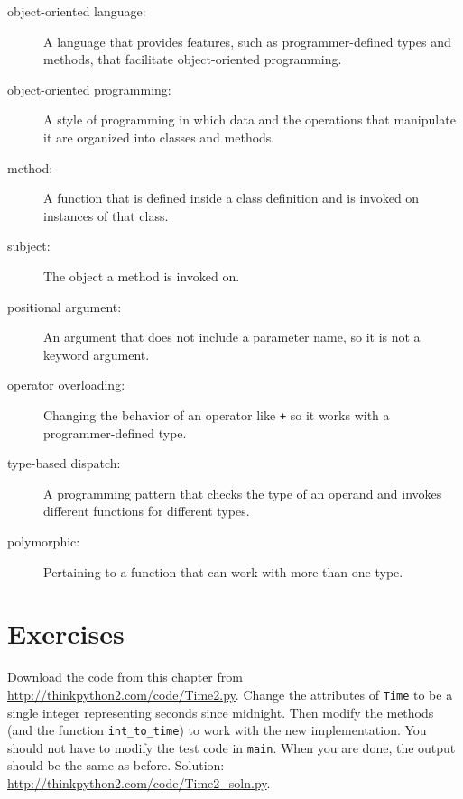 \documentclass[10pt]{book}
\begin{document}
\begin{description}

\item[object-oriented language:] A language that provides features,
  such as programmer-defined types and methods, that facilitate
  object-oriented programming.

\item[object-oriented programming:] A style of programming in which
data and the operations that manipulate it are organized into classes
and methods.

\item[method:] A function that is defined inside a class definition and
is invoked on instances of that class.

\item[subject:] The object a method is invoked on.

\item[positional argument:]  An argument that does not include
a parameter name, so it is not a keyword argument.

\item[operator overloading:] Changing the behavior of an operator like
{\tt +} so it works with a programmer-defined type.

\item[type-based dispatch:] A programming pattern that checks the type
of an operand and invokes different functions for different types.

\item[polymorphic:] Pertaining to a function that can work with more
  than one type.

\end{description}


\section{Exercises}

\begin{exercise}

Download the code from this chapter from
\url{http://thinkpython2.com/code/Time2.py}.  Change the attributes of
    {\tt Time} to be a single integer representing seconds since
    midnight.  Then modify the methods (and the function
    \verb"int_to_time") to work with the new implementation.  You
    should not have to modify the test code in {\tt main}.  When you
    are done, the output should be the same as before.  Solution:
    \url{http://thinkpython2.com/code/Time2_soln.py}.

\end{exercise}
\end{document}
